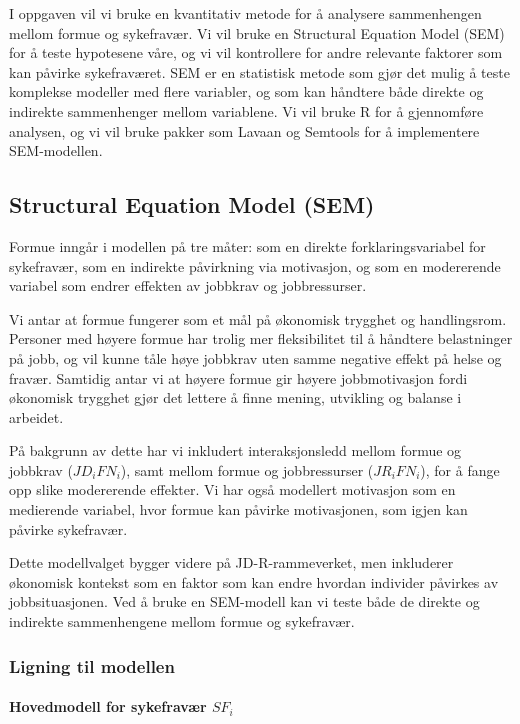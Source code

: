 \documentclass[
  12pt,
  a4paper,
  DIV=11,
  numbers=noendperiod]{scrartcl}
\let\oldparagraph\paragraph
\renewcommand{\paragraph}[1]{\oldparagraph{#1}\mbox{}}
\begin{document}
I oppgaven vil vi bruke en kvantitativ metode for å analysere
sammenhengen mellom formue og sykefravær. Vi vil bruke en Structural
Equation Model (SEM) for å teste hypotesene våre, og vi vil kontrollere
for andre relevante faktorer som kan påvirke sykefraværet. SEM er en
statistisk metode som gjør det mulig å teste komplekse modeller med
flere variabler, og som kan håndtere både direkte og indirekte
sammenhenger mellom variablene. Vi vil bruke R for å gjennomføre
analysen, og vi vil bruke pakker som Lavaan og Semtools for å
implementere SEM-modellen.

\subsection{Structural Equation Model
(SEM)}\label{structural-equation-model-sem}

Formue inngår i modellen på tre måter: som en direkte
forklaringsvariabel for sykefravær, som en indirekte påvirkning via
motivasjon, og som en modererende variabel som endrer effekten av
jobbkrav og jobbressurser.

Vi antar at formue fungerer som et mål på økonomisk trygghet og
handlingsrom. Personer med høyere formue har trolig mer fleksibilitet
til å håndtere belastninger på jobb, og vil kunne tåle høye jobbkrav
uten samme negative effekt på helse og fravær. Samtidig antar vi at
høyere formue gir høyere jobbmotivasjon fordi økonomisk trygghet gjør
det lettere å finne mening, utvikling og balanse i arbeidet.

På bakgrunn av dette har vi inkludert interaksjonsledd mellom formue og
jobbkrav (\(JD_i FN_i\)), samt mellom formue og jobbressurser
(\(JR_i FN_i\)), for å fange opp slike modererende effekter. Vi har også
modellert motivasjon som en medierende variabel, hvor formue kan påvirke
motivasjonen, som igjen kan påvirke sykefravær.

Dette modellvalget bygger videre på JD-R-rammeverket, men inkluderer
økonomisk kontekst som en faktor som kan endre hvordan individer
påvirkes av jobbsituasjonen. Ved å bruke en SEM-modell kan vi teste både
de direkte og indirekte sammenhengene mellom formue og sykefravær.

\subsubsection{Ligning til modellen}\label{ligning-til-modellen}

\paragraph{\texorpdfstring{Hovedmodell for sykefravær
\(SF_i\)}{Hovedmodell for sykefravær SF\_i}}\label{hovedmodell-for-sykefravuxe6r-sf_i}
\end{document}
